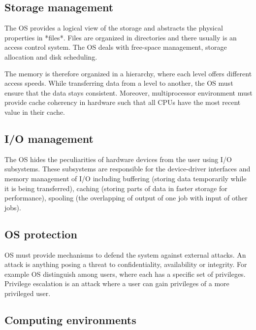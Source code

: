 \subsection{Storage management}

The OS provides a logical view of the storage and abstracts the physical properties in *files*. Files are organized in directories and there usually is an access control system. The OS deals with free-space management, storage allocation and disk scheduling.

The memory is therefore organized in a hierarchy, where each level offers different access speeds. While transferring data from a level to another, the OS must ensure that the data stays consistent. Moreover, multiprocessor environment must provide cache coherency in hardware such that all CPUs have the most recent value in their cache.

\subsection{I/O management}

The OS hides the peculiarities of hardware devices from the user using I/O subsystems. These subsystems are responsible for the device-driver interfaces and memory management of I/O including buffering (storing data temporarily while it is being transferred), caching (storing parts of data in faster storage for performance), spooling (the overlapping of output of one job with input of other jobs).

\subsection{OS protection}

OS must provide mechanisms to defend the system against external attacks. An attack is anything posing a threat to confidentiality, availability or integrity. For example OS distinguish among users, where each has a specific set of privileges. Privilege escalation is an attack where a user can gain privileges of a more privileged user.

\subsection{Computing environments}

